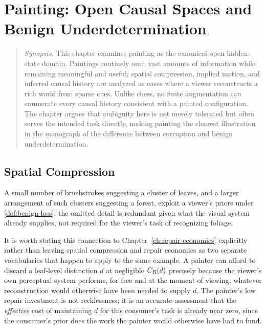 \chapter{Painting: Open Causal Spaces and Benign Underdetermination}
\label{ch:painting}

\begin{quotation}
\noindent\textit{Synopsis.} This chapter examines painting as the canonical
open hidden-state domain. Paintings routinely omit vast amounts of
information while remaining meaningful and useful; spatial compression,
implied motion, and inferred causal history are analyzed as cases where a
viewer reconstructs a rich world from sparse cues. Unlike chess, no finite
augmentation can enumerate every causal history consistent with a painted
configuration. The chapter argues that ambiguity here is not merely
tolerated but often serves the intended task directly, making painting the
clearest illustration in the monograph of the difference between
corruption and benign underdetermination.
\end{quotation}

\section{Spatial Compression}

A small number of brushstrokes suggesting a cluster of leaves, and a
larger arrangement of such clusters suggesting a forest, exploit a
viewer's priors under \cref{def:benign-loss}: the omitted detail is
redundant given what the visual system already supplies, not required
for the viewer's task of recognizing foliage.

\begin{remark}
\label{rem:priors-reduce-cost}
It is worth stating this connection to Chapter~\ref{ch:repair-economics}
explicitly rather than leaving spatial compression and repair economics
as two separate vocabularies that happen to apply to the same example. A
painter can afford to discard a leaf-level distinction $d$ at negligible
$C_R(d)$ precisely because the viewer's own perceptual system
performs, for free and at the moment of viewing, whatever reconstruction
would otherwise have been needed to supply $d$. The painter's low repair
investment is not recklessness; it is an accurate assessment that the
\emph{effective} cost of maintaining $d$ for this consumer's task is
already near zero, since the consumer's prior does the work the painter
would otherwise have had to fund.
\end{remark}

